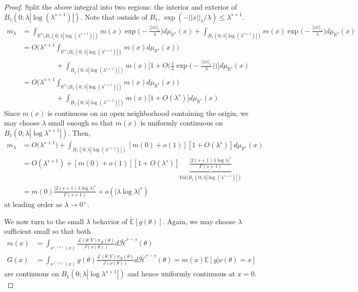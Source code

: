 \documentclass[10pt,fleqn]{article}
\newcommand{\bb}[1]{\mathbb{#1}} \newcommand{\mc}[1]{\mathcal{#1}}
\DeclareMathOperator{\1}{\mathbbm{1}} \DeclareMathOperator{\bigO}{\mc O}
\begin{document}
\begin{proof}
Split the above integral into two regions: the interior and exterior of $B_1(0;\lambda|\log(\lambda^{s+1})|)$. Note that outside of $B_1$, $\exp(-||x||_1/\lambda) \le \lambda^{s+1}.$
\begin{align*}
m_\lambda &= \int_{\mathbb{R}^s \setminus B_1(0;\lambda|\log(\lambda^{s+1})|)}m(x) \exp\bigg(-\frac{||x||_1}{\lambda}\bigg)d\mu_{\mathbb{R}^s}(x) + \int_{B_1(0;\lambda|\log(\lambda^{s+1})|)}m(x) \exp\bigg(-\frac{||x||_1}{\lambda}\bigg)d\mu_{\mathbb{R}^s}(x) \\
&=O\bigg( \lambda^{s+1} \int_{\mathbb{R}^s \setminus B_1(0;\lambda|\log(\lambda^{s+1})|)}m(x) d\mu_{\mathbb{R}^s}(x)\bigg) \\
&\hspace{2cm}+ \int_{B_1(0;\lambda|\log(\lambda^{s+1})|)} m(x) \bigg[1+O\bigg(\frac{1}{\lambda}\exp\bigg(-\frac{||x||_1}{\lambda}\bigg)\bigg)\bigg]d\mu_{\mathbb{R}^s}(x) \\
&=O\bigg( \lambda^{s+1} \int_{\mathbb{R}^s \setminus B_1(0;\lambda|\log(\lambda^{s+1})|)}m(x) d\mu_{\mathbb{R}^s}(x)\bigg) \\
&\hspace{2cm}+ \int_{B_1(0;\lambda|\log(\lambda^{s+1})|)} m(x) \bigg[1+O(\lambda^s) \bigg]d\mu_{\mathbb{R}^s}(x)
\end{align*}
Since $m(x)$ is continuous on an open neighborhood containing the origin, we may choose $\lambda$ small enough so that $m(x)$ is uniformly continuous on $B_1(0;\lambda |\log \lambda^{s+1}|).$ Then, 
\begin{align*}
m_\lambda&= O\bigg( \lambda^{s+1} \bigg) + \int_{B_1(0;\lambda|\log(\lambda^{s+1})|)} [m(0) + o(1)][1+O(\lambda^s)] d\mu_{\mathbb{R}^s} (x) \\
&= O(\lambda^{s+1}) + [m(0)+o(1)][1+ O(\lambda^s)] \underbrace{\frac{|2(s+1)\lambda \log \lambda |^s}{\Gamma(s+1)}}_{Vol(B_1(0;\lambda|\log(\lambda^{s+1})|)}   \\
&= m(0) \frac{|2(s+1)\lambda \log \lambda |^s}{\Gamma(s+1)} + o(|\lambda \log \lambda|^s) 
\end{align*}
at leading order as $\lambda\to 0^+$.


We now turn to the small $\lambda$ behavior of $\tilde{\bb E}[g(\theta)].$  Again, we may choose $\lambda$ sufficient small so that both
\begin{align*}
m(x)&= \int_{\nu^{(-1)}(x)} \frac{\mathcal{L}(\theta;Y)\pi_\mathcal{R}(\theta)}{J(\nu(\theta))} d\bar{\mathcal{H}}^{r-s}(\theta)   \\
G(x)&= \int_{\nu^{(-1)}(x)} g(\theta) \frac{\mathcal{L}(\theta;Y)\pi_\mathcal{R}(\theta)}{J(\nu(\theta))} d\bar{\mathcal{H}}^{r-s}(\theta) =m(x)\bb E[g|\nu(\theta)=x]
\end{align*}
are continuous on $B_1(0;\lambda|\log \lambda^{s+1}|)$ and hence uniformly continuous at $x=0.$ 


\end{proof}
\end{document}
